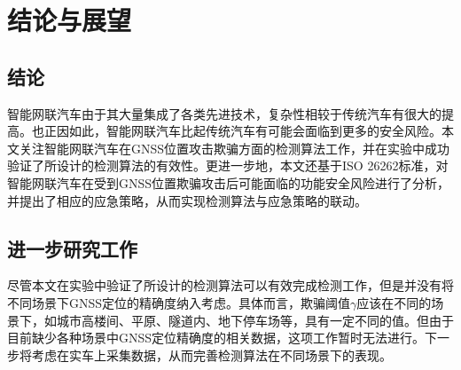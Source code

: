 \section{结论与展望}
\subsection{结论}
智能网联汽车由于其大量集成了各类先进技术，复杂性相较于传统汽车有很大的提高。也正因如此，智能网联汽车比起传统汽车有可能会面临到更多的安全风险。本文关注智能网联汽车在GNSS位置攻击欺骗方面的检测算法工作，并在实验中成功验证了所设计的检测算法的有效性。更进一步地，本文还基于ISO 26262标准，对智能网联汽车在受到GNSS位置欺骗攻击后可能面临的功能安全风险进行了分析，并提出了相应的应急策略，从而实现检测算法与应急策略的联动。
\subsection{进一步研究工作}
尽管本文在实验中验证了所设计的检测算法可以有效完成检测工作，但是并没有将不同场景下GNSS定位的精确度纳入考虑。具体而言，欺骗阈值$\gamma$应该在不同的场景下，如城市高楼间、平原、隧道内、地下停车场等，具有一定不同的值。但由于目前缺少各种场景中GNSS定位精确度的相关数据，这项工作暂时无法进行。下一步将考虑在实车上采集数据，从而完善检测算法在不同场景下的表现。
